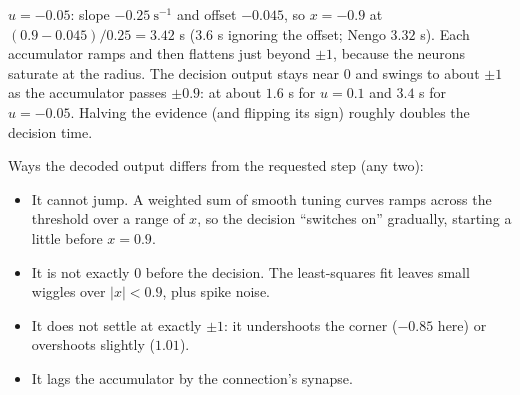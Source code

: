 \documentclass[11pt,letterpaper]{article}
\newcommand{\ans}[1]{\par\vspace{4pt}{\bfseries #1}\quad}
\begin{document}
\ans{(b) [2]}
$u = -0.05$: slope $-0.25\ \mathrm{s^{-1}}$ and offset $-0.045$, so $x = -0.9$ at $(0.9 - 0.045)/0.25 = 3.42$ s ($3.6$ s ignoring the offset; Nengo $3.32$ s). Each accumulator ramps and then flattens just beyond $\pm1$, because the neurons saturate at the radius. The decision output stays near $0$ and swings to about $\pm1$ as the accumulator passes $\pm0.9$: at about $1.6$ s for $u = 0.1$ and $3.4$ s for $u = -0.05$. Halving the evidence (and flipping its sign) roughly doubles the decision time.
\begin{center}
\end{center}
Ways the decoded output differs from the requested step (any two):
\begin{itemize}[leftmargin=1.2em, itemsep=1pt]
\item It cannot jump. A weighted sum of smooth tuning curves ramps across the threshold over a range of $x$, so the decision ``switches on'' gradually, starting a little before $x = 0.9$.
\item It is not exactly $0$ before the decision. The least-squares fit leaves small wiggles over $|x| < 0.9$, plus spike noise.
\item It does not settle at exactly $\pm1$: it undershoots the corner ($-0.85$ here) or overshoots slightly ($1.01$).
\item It lags the accumulator by the connection's synapse.
\end{itemize}
\end{document}
